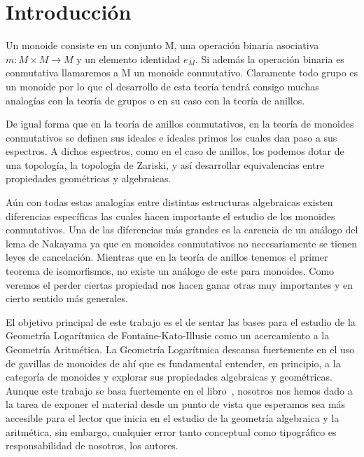 \documentclass[12pt,spanish]{amsart}
\theoremstyle{definition}
\theoremstyle{remark}
\begin{document}
\section{Introducción}
Un monoide consiste en un conjunto M, una operación binaria asociativa $m:M\times M \to M$ y un elemento identidad $e_{M}$. Si además la operación binaria es conmutativa llamaremos a M un monoide conmutativo. Claramente todo grupo es un monoide por lo que el desarrollo de esta teoría tendrá consigo muchas analogías con la teoría de grupos o en su caso con la teoría de anillos. 

De igual forma que en la teoría de anillos conmutativos, en la teoría de monoides conmutativos se definen sus ideales e ideales primos los cuales dan paso a sus espectros. A dichos espectros, como en el caso de anillos, los podemos dotar de una topología, la topología de Zariski, y así desarrollar equivalencias entre propiedades geométricas y algebraicas.

Aún con todas estas analogías entre distintas estructuras algebraicas existen diferencias específicas las cuales hacen importante el estudio de los monoides conmutativos. Una de las diferencias más grandes es la carencia de un análogo del lema de Nakayama ya que en monoides conmutativos no necesariamente se tienen leyes de cancelación. Mientras que en la teoría de anillos tenemos el primer teorema de isomorfismos, no existe un análogo de este para monoides. Como veremos el perder ciertas propiedad nos hacen ganar otras muy importantes y en cierto sentido más generales.


El objetivo principal de este trabajo es el de sentar las bases para el estudio de la Geometría Logarítmica de Fontaine-Kato-Illusie como un acercamiento a la Geometría Aritmética. La Geometría Logarítmica descansa fuertemente en el uso de gavillas de monoides de ahí que es fundamental entender, en principio, a la categoría de monoides y explorar sus propiedades algebraicas y geométricas. Aunque este trabajo se basa fuertemente en el libro~\cite{Ogus:2018aa}, nosotros nos hemos dado a la tarea de exponer el material desde un punto de vista que esperamos sea más accesible para el lector que inicia en el estudio de la geometría algebraica y la aritmética, sin embargo, cualquier error tanto conceptual como tipográfico es responsabilidad de nosotros, los autores. 
\end{document}
